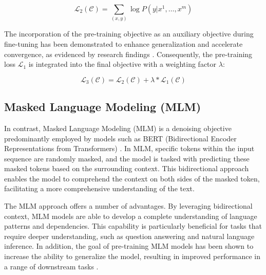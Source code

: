 \begin{equation}
    \mathcal{L}_2(\mathcal{C}) = \sum_{(x,y)} \log P(y | x^1, \ldots, x^m)
\end{equation}

The incorporation of the pre-training objective as an auxiliary objective during fine-tuning has been demonstrated to enhance generalization and accelerate convergence, as evidenced by research findings \cite{radford2018improving}. Consequently, the pre-training loss \( \mathcal{L}_1 \) is integrated into the final objective with a weighting factor \( \lambda \):

\begin{equation}
    \mathcal{L}_3(\mathcal{C}) = \mathcal{L}_2(\mathcal{C}) + \lambda \ast \mathcal{L}_1(\mathcal{C})
\end{equation}
 
\subsection{Masked Language Modeling (MLM)}

In contrast, Masked Language Modeling (MLM) is a denoising objective predominantly employed by models such as BERT (Bidirectional Encoder Representations from Transformers) \cite{devlin2018bert}. In MLM, specific tokens within the input sequence are randomly masked, and the model is tasked with predicting these masked tokens based on the surrounding context. This bidirectional approach enables the model to comprehend the context on both sides of the masked token, facilitating a more comprehensive understanding of the text.

The MLM approach offers a number of advantages. By leveraging bidirectional context, MLM models are able to develop a complete understanding of language patterns and dependencies. This capability is particularly beneficial for tasks that require deeper understanding, such as question answering and natural language inference. In addition, the goal of pre-training MLM models has been shown to increase the ability to generalize the model, resulting in improved performance in a range of downstream tasks \cite{yang2019xlnet}.

